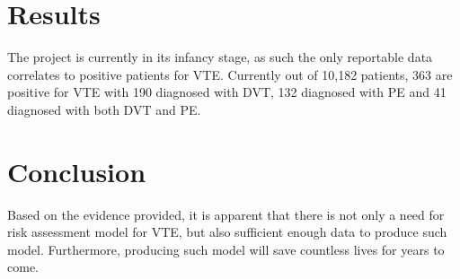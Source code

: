 \documentclass{article}[10pt,letterpaper]
\begin{document}
\section{Results}
The project is currently in its infancy stage, as such the only reportable data correlates to positive patients for VTE. Currently out of 10,182 patients, 363 are positive for VTE with 190 diagnosed with DVT, 132 diagnosed with PE and 41 diagnosed with both DVT and PE. 
\section{Conclusion}
Based on the evidence provided, it is apparent that there is not only a need for risk assessment model for VTE, but also sufficient enough data to produce such model. Furthermore, producing such model will save countless lives for years to come. 



\end{document}
